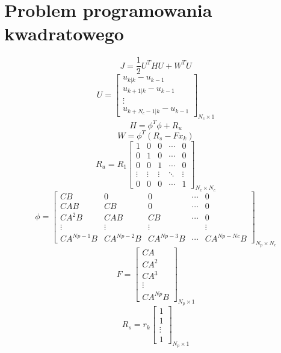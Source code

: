 \section{Problem programowania kwadratowego} \label{sec:qp}
\begin{equation}
    J=\frac{1}{2}U^{T}HU+W^{T}U
    \label{eq:J}
\end{equation}
\begin{equation}
	U = \begin{bmatrix}
    u_{k|k}-u_{k-1} \\
	u_{k+1|k}-u_{k-1} \\
    \vdots \\
    u_{k+N_{c}-1|k}-u_{k-1}
	\end{bmatrix}_{N_{c} \times 1}
\label{eq:U}
\end{equation}
\begin{equation}
    H={\phi}^{T}\phi+R_{u}
    \label{eq:H}
\end{equation}
\begin{equation}
    W={\phi}^{T}(R_{s}-Fx_{k})
    \label{eq:W}
\end{equation}
\begin{equation}
    R_{u} = R_{1} 
    \begin{bmatrix}
	    1 & 0 & 0 & \cdots & 0 \\[-0.8ex]
	    0 & 1 & 0 & \cdots & 0 \\[-0.8ex]
	    0 & 0 & 1 & \cdots & 0 \\[-0.8ex]
        \vdots & \vdots & \vdots & \ddots & \vdots \\[-0.8ex]
        0 & 0 & 0 & \cdots & 1
	\end{bmatrix}_{N_{c} \times N_{c}}
\label{eq:Rw}
\end{equation}
\begin{equation}
	\phi = \begin{bmatrix}
	CB & 0 & 0 & \cdots & 0 \\
	CAB & CB & 0 & \cdots & 0 \\
	CA^{2}B & CAB & CB & \cdots & 0 \\
    \vdots & \vdots & \vdots &  & \vdots \\
    CA^{Np-1}B & CA^{Np-2}B & CA^{Np-3}B & \cdots & CA^{Np-Nc}B
	\end{bmatrix}
\label{eq:phi}_{N_{p} \times N_{c}}
\end{equation}
\begin{equation}
	F = \begin{bmatrix}
	CA \\
	CA^{2} \\
	CA^{3} \\
    \vdots \\
    CA^{Np}B
	\end{bmatrix}_{N_{p} \times 1}
\label{eq:F}
\end{equation}
\begin{equation}
    R_{s} = r_{k}\begin{bmatrix}
    1 \\
    1 \\
    \vdots \\
    1
    \end{bmatrix}_{N_{p} \times 1}
\label{eq:Y}
\end{equation}

